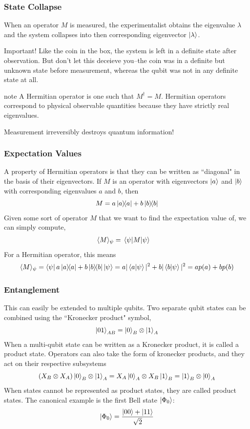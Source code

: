 \documentclass{beamer}
\begin{document}
\begin{frame}
\frametitle{State Collapse}
When an operator $M$ is measured, the experimentalist obtains the eigenvalue $\lambda$ and the system collapses into then corresponding eigenvector $\ket{\lambda}$.
\begin{alertblock}{Important!}
    Like the coin in the box, the system is left in a definite state after observation. But don't let this deceieve you--the coin was in a definite but unknown state before measurement, whereas the qubit was not in any definite state at all.
\end{alertblock}
\begin{block}{note}
A Hermitian operator is one such that $M^\dagger = M$. Hermitian operators correspond to physical observable quantities because they have strictly real eigenvalues.
\end{block}
Measurement irreversibly destroys quantum information!
\end{frame}
\begin{frame}
\frametitle{Expectation Values}
A property of Hermitian operators is that they can be written as ``diagonal" in the basis of their eigenvectors. If $M$ is an operator with eigenvectors $\ket{a}$ and $\ket{b}$ with corresponding eigenvalues $a$ and $b$, then
$$
M = a\ketbra{a}{a}+b\ketbra{b}{b}
$$
Given some sort of operator $M$ that we want to find the expectation value of, we can simply compute,
\begin{align*}
    \langle M \rangle_\psi &= \expval{M}{\psi}
\end{align*}
For a Hermitian operator, this means
$$
\langle M \rangle_\psi = \bra{\psi} a\ketbra{a}{a}+b\ketbra{b}{b}\ket{\psi} = a|\braket{a}{\psi}|^2+b|\braket{b}{\psi}|^2 = ap(a)+bp(b)
$$
\end{frame}
\begin{frame}
\frametitle{Entanglement}
This can easily be extended to multiple qubits. Two separate qubit states can be combined using the ``Kronecker product" symbol,
$$
\ket{01}_{AB} = \ket{0}_B \otimes \ket{1}_A
$$
When a multi-qubit state can be written as a Kronecker product, it is called a product state. Operators can also take the form of kronecker products, and they act on their respective subsystems
$$
(X_B \otimes X_A)\ket{0}_B \otimes \ket{1}_A = X_A\ket{0}_A \otimes X_B\ket{1}_B = \ket{1}_B \otimes \ket{0}_A
$$
When states cannot be represented as product states, they are called product states. The canonical example is the first Bell state $\ket{\Phi_0}$:
$$
\ket{\Phi_0} = \frac{\ket{00}+\ket{11}}{\sqrt{2}}
$$
\end{frame}
\end{document}
